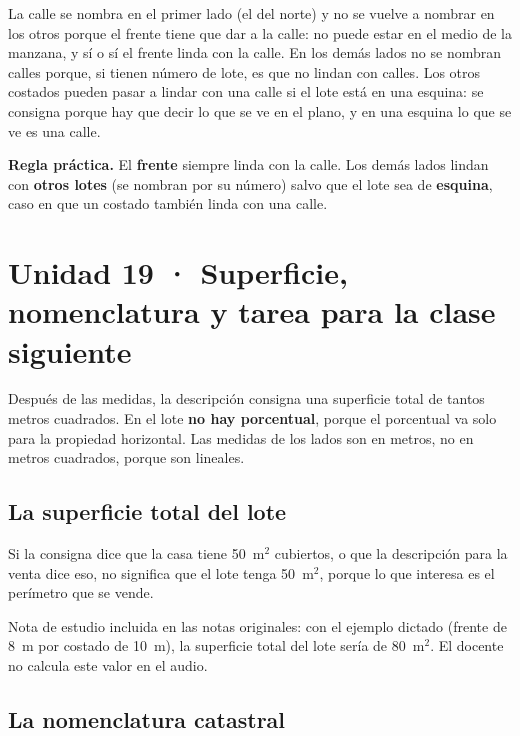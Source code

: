 \documentclass[12pt,oneside]{book}
\newcommand{\mcuad}{$\mathrm{m}^2$}
\begin{document}
La calle se nombra en el primer lado (el del norte) y no se vuelve a nombrar en los otros porque el frente tiene que dar a la calle: no puede estar en el medio de la manzana, y sí o sí el frente linda con la calle. En los demás lados no se nombran calles porque, si tienen número de lote, es que no lindan con calles. Los otros costados pueden pasar a lindar con una calle si el lote está en una esquina: se consigna porque hay que decir lo que se ve en el plano, y en una esquina lo que se ve es una calle.

\begin{important}
\textbf{Regla práctica.} El \textbf{frente} siempre linda con la calle. Los demás lados lindan con \textbf{otros lotes} (se nombran por su número) salvo que el lote sea de \textbf{esquina}, caso en que un costado también linda con una calle.
\end{important}

\section{Unidad 19 · Superficie, nomenclatura y tarea para la clase siguiente}

Después de las medidas, la descripción consigna una superficie total de tantos metros cuadrados. En el lote \textbf{no hay porcentual}, porque el porcentual va solo para la propiedad horizontal. Las medidas de los lados son en metros, no en metros cuadrados, porque son lineales.

\subsection{La superficie total del lote}

Si la consigna dice que la casa tiene 50~\mcuad{} cubiertos, o que la descripción para la venta dice eso, no significa que el lote tenga 50~\mcuad, porque lo que interesa es el perímetro que se vende.

\begin{note}
Nota de estudio incluida en las notas originales: con el ejemplo dictado (frente de 8~m por costado de 10~m), la superficie total del lote sería de 80~\mcuad. El docente no calcula este valor en el audio.
\end{note}

\subsection{La nomenclatura catastral}
\end{document}
